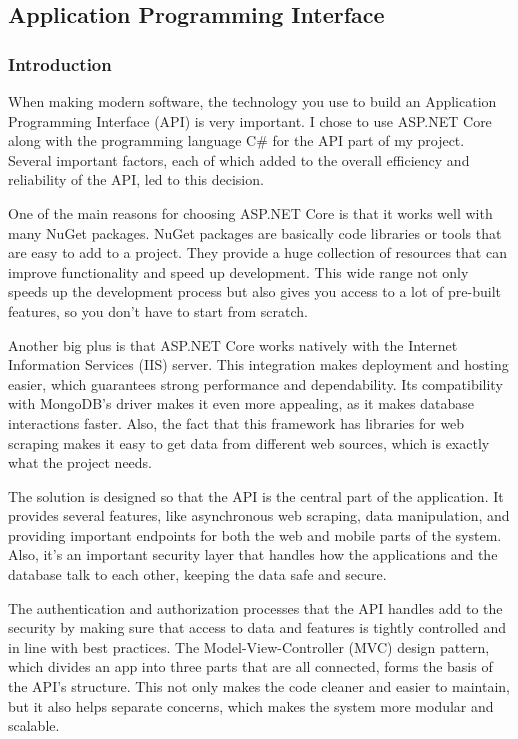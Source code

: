 \newpage

\subsection{Application Programming Interface}

\subsubsection{Introduction}

When making modern software, the technology you use to build an Application Programming Interface (API) is very important. I chose to use ASP.NET Core along with the programming language C\# for the API part of my project. Several important factors, each of which added to the overall efficiency and reliability of the API, led to this decision.

One of the main reasons for choosing ASP.NET Core is that it works well with many NuGet packages. NuGet packages are basically code libraries or tools that are easy to add to a project. They provide a huge collection of resources that can improve functionality and speed up development. This wide range not only speeds up the development process but also gives you access to a lot of pre-built features, so you don't have to start from scratch.

Another big plus is that ASP.NET Core works natively with the Internet Information Services (IIS) server. This integration makes deployment and hosting easier, which guarantees strong performance and dependability. Its compatibility with MongoDB's driver makes it even more appealing, as it makes database interactions faster. Also, the fact that this framework has libraries for web scraping makes it easy to get data from different web sources, which is exactly what the project needs.
\newline\cite{aspnet}

The solution is designed so that the API is the central part of the application. It provides several features, like asynchronous web scraping, data manipulation, and providing important endpoints for both the web and mobile parts of the system. Also, it's an important security layer that handles how the applications and the database talk to each other, keeping the data safe and secure.

The authentication and authorization processes that the API handles add to the security by making sure that access to data and features is tightly controlled and in line with best practices. The Model-View-Controller (MVC) design pattern, which divides an app into three parts that are all connected, forms the basis of the API's structure. This not only makes the code cleaner and easier to maintain, but it also helps separate concerns, which makes the system more modular and scalable.

